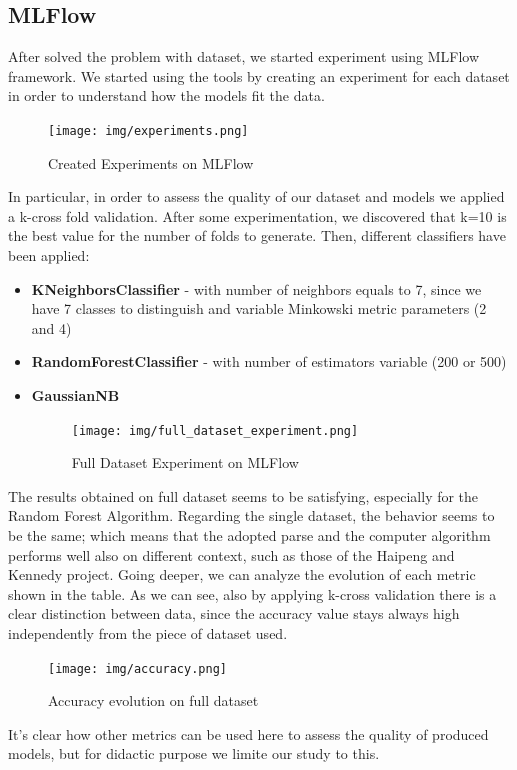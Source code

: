 \documentclass[sigconf]{acmart}
\begin{document}
\subsection{MLFlow}
After solved the problem with dataset, we started experiment using MLFlow framework.
We started using the tools by creating an experiment for each dataset in order to understand how the models fit the data.
\begin{figure}[h!]
        \texttt{[image: img/experiments.png]}
        \caption{Created Experiments on MLFlow}
        \label{fig:experiments}
    \end{figure}
In particular, in order to assess the quality of our dataset and models we applied a k-cross fold validation. After some experimentation, we discovered that k=10 is the best value for the number of folds to generate. Then, different classifiers have been applied:
\begin{itemize}
\item \textbf{KNeighborsClassifier} - with number of neighbors equals to 7, since we have 7 classes to distinguish and variable Minkowski metric parameters (2 and 4)
\item \textbf{RandomForestClassifier} - with number of estimators variable (200 or 500)
\item \textbf{GaussianNB}
\begin{figure}[h!]
        \texttt{[image: img/full\_dataset\_experiment.png]}
        \caption{Full Dataset Experiment on MLFlow}
        \label{fig:full_dataset_experiment}
    \end{figure}
\end{itemize}
The results obtained on full dataset seems to be satisfying, especially for the Random Forest Algorithm. Regarding the single dataset, the behavior seems to be the same; which means that the adopted parse and the computer algorithm performs well also on different context, such as those of the Haipeng and Kennedy project.
Going deeper, we can analyze the evolution of each metric shown in the table. As we can see, also by applying k-cross validation there is a clear distinction between data, since the accuracy value stays always high independently from the piece of dataset used.
\begin{figure}[h!]
        \texttt{[image: img/accuracy.png]}
        \caption{Accuracy evolution on full dataset}
        \label{fig:accuracy}
    \end{figure}
It's clear how other metrics can be used here to assess the quality of produced models, but for didactic purpose we limite our study to this.
\end{document}
